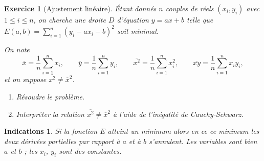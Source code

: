 \documentclass[11pt,a4paper]{article}
\renewcommand{\le}{\leqslant} \renewcommand{\leq}{\leqslant}
\theoremstyle{exostyle}
\newtheorem{exo}{Exercice}
\newtheorem{ind}{Indications}
\newcommand{\exercice}[1]{} \newcommand{\finexercice}{}
\newcommand{\enonce}{\begin{exo}} \newcommand{\finenonce}{\end{exo}}
\newcommand{\indication}{\begin{ind}} \newcommand{\finindication}{\end{ind}}
\begin{document}
\exercice{4159, quercia, 2010/03/11}
\enonce[Ajustement linéaire]

Étant donnés $n$ couples de réels  
$(x_i,y_i)$ avec $1 \le i \le n$,
on cherche une droite $D$ d'équation $y = ax+b$ telle que
$E(a,b) = \sum_{i=1}^n (y_i-ax_i-b)^2$ soit minimal.

On note
$$\overline  x    = \frac 1n \sum_{i=1}^n x_i,\qquad
\overline  y    = \frac 1n \sum_{i=1}^n y_i,\qquad
\overline {x^2} = \frac 1n \sum_{i=1}^n x_i^2,\qquad
\overline {xy} = \frac 1n \sum_{i=1}^n x_iy_i,$$
et on suppose $\overline {x^2} \ne \overline x^2$.

\begin{enumerate}
	\item Résoudre le problème.
	\item Interpréter la relation $\overline {x^2} \ne \overline x^2$
	à l'aide de l'inégalité de Cauchy-Schwarz.
\end{enumerate}
\finenonce

\indication
Si la fonction $E$ atteint un minimum alors en ce ce minimum les deux dérivées partielles par rapport à $a$ et à $b$ s'annulent. Les variables sont bien $a$ et $b$ ; les $x_i$, $y_i$ sont des constantes.
\finindication
\end{document}

